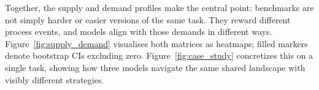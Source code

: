 Together, the supply and demand profiles make the central point: benchmarks are not simply harder or easier versions of the same task.
They reward different process events, and models align with those demands in different ways.
Figure~\ref{fig:supply_demand} visualises both matrices as heatmaps; filled markers denote bootstrap CIs excluding zero.
Figure~\ref{fig:case_study} concretizes this on a single \swe{} task, showing how three models navigate the same shared landscape with visibly different strategies.
